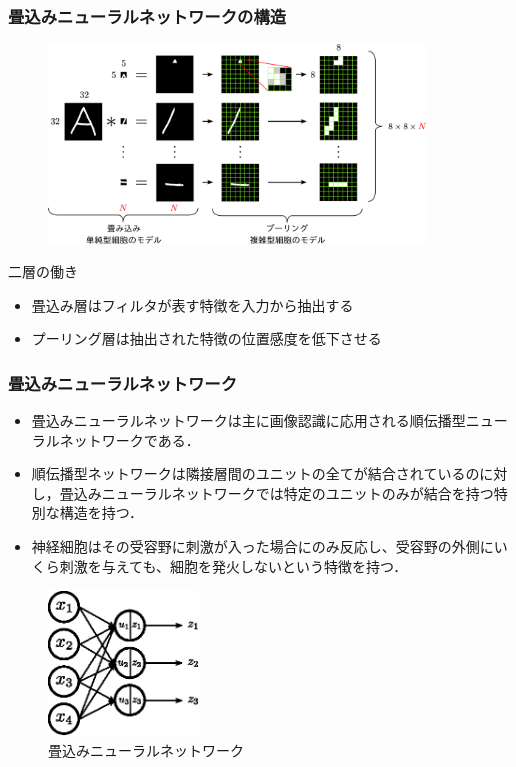\documentclass[dvipdfmx,11pt,notheorems]{beamer}
\theoremstyle{definition}
\begin{document}
\begin{frame}[fragile]\frametitle{畳込みニューラルネットワークの構造}

\begin{figure}[tb]
  \begin{center}
    \includegraphics[clip,width=10cm]{fig/eps/conv_pool.eps}
  \end{center}
\end{figure}

\begin{block}{二層の働き}
\begin{itemize}
\item 畳込み層はフィルタが表す特徴を入力から抽出する
\item プーリング層は抽出された特徴の位置感度を低下させる
\end{itemize}
\end{block}

\end{frame}

\begin{frame}[fragile]\frametitle{畳込みニューラルネットワーク}
\begin{itemize}
\item 畳込みニューラルネットワークは主に画像認識に応用される順伝播型ニューラルネットワークである．
\item 順伝播型ネットワークは隣接層間のユニットの全てが結合されているのに対し，畳込みニューラルネットワークでは特定のユニットのみが結合を持つ特別な構造を持つ．
\item 神経細胞はその受容野に刺激が入った場合にのみ反応し、受容野の外側にいくら刺激を与えても、細胞を発火しないという特徴を持つ．
\end{itemize}

\begin{figure}[htbp]
  \begin{center}
   \includegraphics[width=40mm]{fig/eps/network.eps}
  \end{center}
  \caption{畳込みニューラルネットワーク}
  \label{fig:FNN}
\end{figure}
\end{frame}
\end{document}
